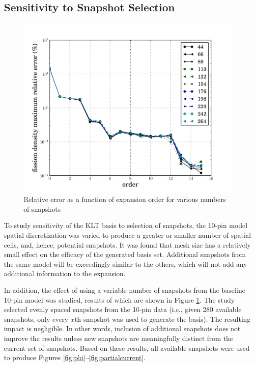 \documentclass{anstrans}
\begin{document}
\subsection{Sensitivity to Snapshot Selection}

\begin{figure}[htb]
 \centering
 \includegraphics[trim=.5cm .25cm 1.5cm 1.25cm, clip=true, totalheight=0.28\textheight]{number}
 \caption{Relative error as a function of expansion order for various numbers of snapshots}
 \label{fig:number}
\end{figure}

To study sensitivity of  the KLT basis to selection of snapshots, the 10-pin model spatial discretization was varied to produce a greater or smaller number of spatial cells, and, hence, potential snapshots. It was found that mesh size has a relatively small effect on the efficacy of the generated basis set.  Additional snapshots from the same model will be exceedingly similar to the others, which will not add any additional information to the expansion.

In addition, the effect of using a variable number of snapshots from the baseline 10-pin model was studied, results of which are shown in Figure \ref{fig:number}.  The study selected evenly spaced snapshots from the 10-pin data (i.e., given 280 available snapshots, only every $x$th snapshot was used to generate the basis). The resulting impact is negligible.  In other words, inclusion of additional snapshots does not improve the results unless new snapshots are meaningfully distinct from the current set of snapshots.
Based on these results, all available snapshots were used to produce Figures \ref{fig:phi}--\ref{fig:partialcurrent}.
%
\end{document}
